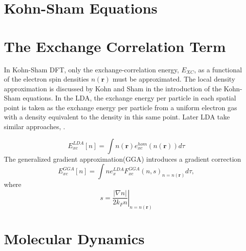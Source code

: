 \section{Kohn-Sham Equations}

\section{The Exchange Correlation Term}

In Kohn-Sham DFT, only the exchange-correlation energy, $E_{XC}$, as a functional of the electron spin densities $n(\bm{r})$ must be approximated.
The local density approximation is discussed by Kohn and Sham\cite{kohn1965_dft} in the introduction of the Kohn-Sham equations.
In the LDA, the exchange energy per particle in each spatial point is taken as the exchange energy per particle from a uniform electron gas with a density equivalent to the density in this same point\cite{ceperley1980_lda}.
Later LDA take similar approaches, \cite{vosko1980_lda_vwm, perdew1981_lda_pz, perdew1992_lda_pw}.

\begin{equation}
	E_{xc}^{LDA}[n]=\int n(\bm{r})e_{xc}^{hom}(n(\bm{r}))d\tau
\end{equation}
The generalized gradient approximation(GGA)\cite{langreth1983_gga_1,becke1988_gga_2} introduces a gradient correction
\begin{equation}
	E_{xc}^{GGA}[n]=\int n e_x^{LDA} F_{xc}^{GGA}(n,s)_{n=n(\bm{r})}d\tau,
\end{equation}
where
\begin{equation}
	s =\left.
	       \frac{\lvert\nabla n\rvert}{2k_F n}
	   \right\rvert_{n=n(\bm{r})}
\end{equation}

\section{Molecular Dynamics}
